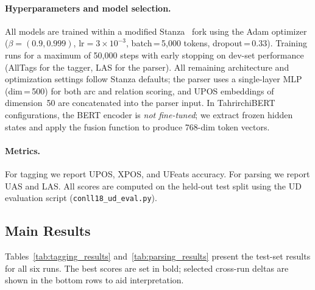 \documentclass[runningheads]{llncs}
\begin{document}
\paragraph{Hyperparameters and model selection.}
All models are trained within a modified Stanza~\cite{qi-etal-2020-stanza} fork using the Adam optimizer ($\beta=(0.9,0.999)$, $\text{lr}=3\!\times\!10^{-3}$, batch\,=\,5{,}000 tokens, dropout\,=\,0.33).
Training runs for a maximum of 50{,}000 steps with early stopping on dev-set performance (AllTags for the tagger, LAS for the parser).
All remaining architecture and optimization settings follow Stanza defaults; the parser uses a single-layer MLP (dim\,=\,500) for both arc and relation scoring, and UPOS embeddings of dimension~50 are concatenated into the parser input.
In TahrirchiBERT configurations, the BERT encoder is \emph{not fine-tuned}; we extract frozen hidden states and apply the fusion function to produce 768-dim token vectors.

\paragraph{Metrics.}
For tagging we report UPOS, XPOS, and UFeats accuracy.
For parsing we report UAS and LAS.
All scores are computed on the held-out test split using the UD evaluation script (\texttt{conll18\_ud\_eval.py}).

\subsection{Main Results}
\label{sec:main_results}

Tables~\ref{tab:tagging_results} and~\ref{tab:parsing_results} present the test-set results for all six runs.
The best scores are set in bold; selected cross-run deltas are shown in the bottom rows to aid interpretation.
\end{document}
